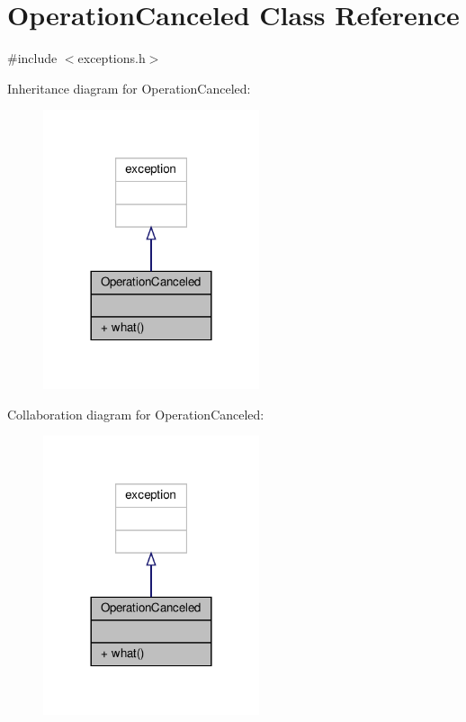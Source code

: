 \hypertarget{classOperationCanceled}{}\section{Operation\+Canceled Class Reference}
\label{classOperationCanceled}


{\ttfamily \#include $<$exceptions.\+h$>$}



Inheritance diagram for Operation\+Canceled\+:\nopagebreak
\begin{figure}[H]
\begin{center}
\leavevmode
\includegraphics[width=180pt]{classOperationCanceled__inherit__graph}
\end{center}
\end{figure}


Collaboration diagram for Operation\+Canceled\+:\nopagebreak
\begin{figure}[H]
\begin{center}
\leavevmode
\includegraphics[width=180pt]{classOperationCanceled__coll__graph}
\end{center}
\end{figure}
